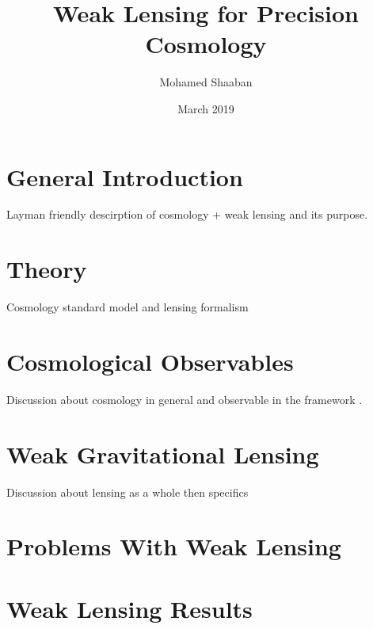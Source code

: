 \documentclass{article}
\title{Weak Lensing for Precision Cosmology}
\author{Mohamed Shaaban}
\date{March 2019}
\begin{document}
\maketitle

\section{General Introduction}
Layman friendly descirption of cosmology + weak lensing and its purpose.

\section{Theory}

Cosmology standard model and lensing formalism

\section{Cosmological Observables}
Discussion about cosmology in general and observable in the framework \cite{general_2013}.

\section{Weak Gravitational Lensing}
Discussion about lensing as a whole then specifics \cite{rachel_2018} \cite{massey_2013} \cite{Subaru_2019} 

\section{Problems With Weak Lensing}

\section{Weak Lensing Results}



\end{document}
